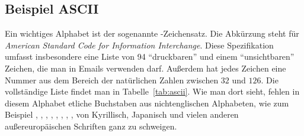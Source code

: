 \subsection{Beispiel ASCII}
\label{subsec:ascii}

Ein wichtiges Alphabet ist der sogenannte
-Zeichensatz. Die Abkürzung steht für \emph{American
  Standard Code for Information Interchange}. Diese Spezifikation
umfasst insbesondere eine Liste von 94 "`druckbaren"' und einem
"`unsichtbaren"' Zeichen, die man \zB in Emails verwenden
darf. Außerdem hat jedes Zeichen eine Nummer aus dem Bereich der
natürlichen Zahlen zwischen $32$ und $126$. Die vollständige Liste
findet man in Tabelle~\ref{tab:ascii}.  Wie man dort sieht, fehlen in
diesem Alphabet etliche Buchstaben aus nichtenglischen Alphabeten, wie
zum Beispiel , , ,
, , \literal{\oe}, ,
 \usw, von Kyrillisch, Japanisch und vielen anderen
außereuropäischen Schriften ganz zu schweigen.

